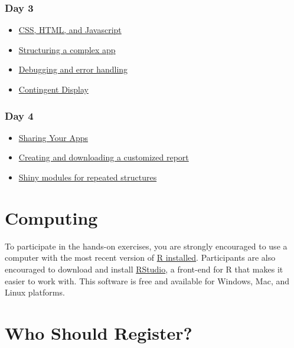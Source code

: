 \documentclass[
]{book}
\providecommand{\tightlist}{%
  \setlength{\itemsep}{0pt}\setlength{\parskip}{0pt}}
\begin{document}
\hypertarget{day-3}{%
\subsubsection{Day 3}\label{day-3}}

\begin{itemize}
\tightlist
\item
  \protect\hyperlink{web}{CSS, HTML, and Javascript}
\item
  \protect\hyperlink{structure}{Structuring a complex app}
\item
  \protect\hyperlink{debugging}{Debugging and error handling}
\item
  \protect\hyperlink{contingency}{Contingent Display}
\end{itemize}

\hypertarget{day-4}{%
\subsubsection{Day 4}\label{day-4}}

\begin{itemize}
\tightlist
\item
  \protect\hyperlink{sharing}{Sharing Your Apps}
\item
  \protect\hyperlink{reports}{Creating and downloading a customized report}
\item
  \protect\hyperlink{modules}{Shiny modules for repeated structures}
\end{itemize}

\hypertarget{computing}{%
\section{Computing}\label{computing}}

To participate in the hands-on exercises, you are strongly encouraged to use a computer with the most recent version of \href{https://www.r-project.org/}{R installed}. Participants are also encouraged to download and install \href{https://www.rstudio.com/products/rstudio/download/}{RStudio}, a front-end for R that makes it easier to work with. This software is free and available for Windows, Mac, and Linux platforms.

\hypertarget{who-should-register}{%
\section{Who Should Register?}\label{who-should-register}}
\end{document}
